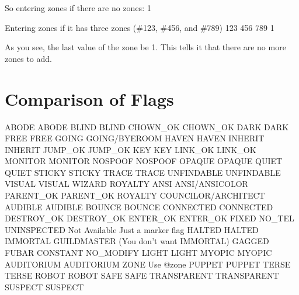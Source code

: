 \documentclass[letterpaper,10pt,english]{sphinxmanual}
\begin{document}
\sphinxAtStartPar
So entering zones if there are no zones:
\sphinxhyphen{}1

\sphinxAtStartPar
Entering zones if it has three zones (\#123, \#456, and \#789)
123
456
789
\sphinxhyphen{}1

\sphinxAtStartPar
As you see, the last value of the zone  be \sphinxhyphen{}1.  This tells it
that there are no more zones to add.


\section{Comparison of Flags}
\label{\detokenize{flags:comparison-of-flags}}\label{\detokenize{flags::doc}}
\sphinxAtStartPar
ABODE           \sphinxhyphen{} ABODE
BLIND           \sphinxhyphen{} BLIND
CHOWN\_OK        \sphinxhyphen{} CHOWN\_OK
DARK            \sphinxhyphen{} DARK
FREE            \sphinxhyphen{} FREE
GOING           \sphinxhyphen{} GOING/BYEROOM
HAVEN           \sphinxhyphen{} HAVEN
INHERIT         \sphinxhyphen{} INHERIT
JUMP\_OK         \sphinxhyphen{} JUMP\_OK
KEY             \sphinxhyphen{} KEY
LINK\_OK         \sphinxhyphen{} LINK\_OK
MONITOR         \sphinxhyphen{} MONITOR
NOSPOOF         \sphinxhyphen{} NOSPOOF
OPAQUE          \sphinxhyphen{} OPAQUE
QUIET           \sphinxhyphen{} QUIET
STICKY          \sphinxhyphen{} STICKY
TRACE           \sphinxhyphen{} TRACE
UNFINDABLE      \sphinxhyphen{} UNFINDABLE
VISUAL          \sphinxhyphen{} VISUAL
WIZARD          \sphinxhyphen{} ROYALTY
ANSI            \sphinxhyphen{} ANSI/ANSICOLOR
PARENT\_OK       \sphinxhyphen{} PARENT\_OK
ROYALTY         \sphinxhyphen{} COUNCILOR/ARCHITECT
AUDIBLE         \sphinxhyphen{} AUDIBLE
BOUNCE          \sphinxhyphen{} BOUNCE
CONNECTED       \sphinxhyphen{} CONNECTED
DESTROY\_OK      \sphinxhyphen{} DESTROY\_OK
ENTER\_OK        \sphinxhyphen{} ENTER\_OK
FIXED           \sphinxhyphen{} NO\_TEL
UNINSPECTED     \sphinxhyphen{} Not Available \sphinxhyphen{} Just a marker flag
HALTED          \sphinxhyphen{} HALTED
IMMORTAL        \sphinxhyphen{} GUILDMASTER (You don’t want IMMORTAL)
GAGGED          \sphinxhyphen{} FUBAR
CONSTANT        \sphinxhyphen{} NO\_MODIFY
LIGHT           \sphinxhyphen{} LIGHT
MYOPIC          \sphinxhyphen{} MYOPIC
AUDITORIUM      \sphinxhyphen{} AUDITORIUM
ZONE            \sphinxhyphen{} Use @zone
PUPPET          \sphinxhyphen{} PUPPET
TERSE           \sphinxhyphen{} TERSE
ROBOT           \sphinxhyphen{} ROBOT
SAFE            \sphinxhyphen{} SAFE
TRANSPARENT     \sphinxhyphen{} TRANSPARENT
SUSPECT         \sphinxhyphen{} SUSPECT
\end{document}
